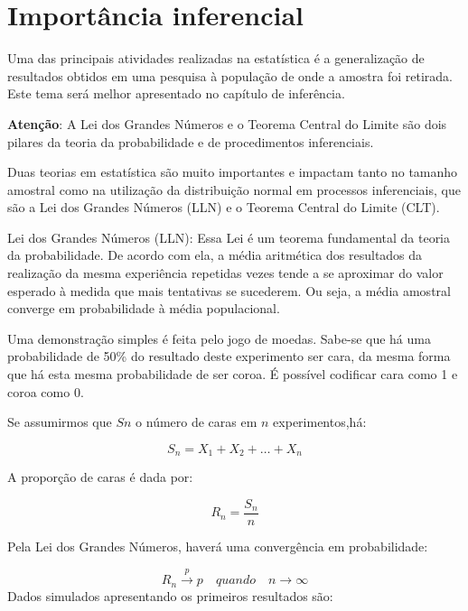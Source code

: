 \documentclass[
]{book}
\newenvironment{Shaded}{\begin{snugshade}}{\end{snugshade}}
\newcommand{\KeywordTok}[1]{\textcolor[rgb]{0.13,0.29,0.53}{\textbf{#1}}}
\newcommand{\NormalTok}[1]{#1}
\newcommand{\OperatorTok}[1]{\textcolor[rgb]{0.81,0.36,0.00}{\textbf{#1}}}
\newcommand{\StringTok}[1]{\textcolor[rgb]{0.31,0.60,0.02}{#1}}
\begin{document}
\hypertarget{importuxe2ncia-inferencial}{%
\section{Importância inferencial}\label{importuxe2ncia-inferencial}}

Uma das principais atividades realizadas na estatística é a generalização de resultados obtidos em uma pesquisa à população de onde a amostra foi retirada. Este tema será melhor apresentado no capítulo de inferência.

\textbf{Atenção}: A Lei dos Grandes Números e o Teorema Central do Limite são dois pilares da teoria da probabilidade e de procedimentos inferenciais.

Duas teorias em estatística são muito importantes e impactam tanto no tamanho amostral como na utilização da distribuição normal em processos inferenciais, que são a Lei dos Grandes Números (LLN) e o Teorema Central do Limite (CLT).

Lei dos Grandes Números (LLN): Essa Lei é um teorema fundamental da teoria da probabilidade. De acordo com ela, a média aritmética dos resultados da realização da mesma experiência repetidas vezes tende a se aproximar do valor esperado à medida que mais tentativas se sucederem. Ou seja, a média amostral converge em probabilidade à média populacional.

Uma demonstração simples é feita pelo jogo de moedas. Sabe-se que há uma probabilidade de 50\% do resultado deste experimento ser cara, da mesma forma que há esta mesma probabilidade de ser coroa. É possível codificar cara como 1 e coroa como 0.

Se assumirmos que \(Sn\) o número de caras em \(n\) experimentos,há:

\[S_n = X_1 + X_2 + \dots + X_n\]

A proporção de caras é dada por:

\[R_n = \frac{S_n}{n}\]

Pela Lei dos Grandes Números, haverá uma convergência em probabilidade:

\[R_n \overset{p}{\to} p\quad quando \quad n \rightarrow \infty \]
Dados simulados apresentando os primeiros resultados são:

\begin{Shaded}
\end{Shaded}
\end{document}
